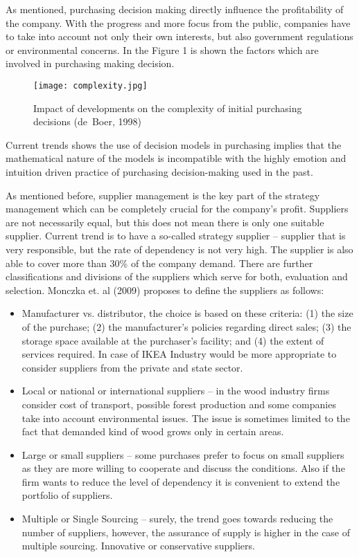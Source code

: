 \documentclass[oneside,12pt]{article}%
\begin{document}
As mentioned, purchasing decision making directly influence the profitability of the company. With the progress and more focus from the public, companies have to take into account not only their own interests, but also government regulations or environmental concerns. In the Figure 1 is shown the factors which are involved in purchasing making decision.

\begin{figure}[ht!]
  \texttt{[image: complexity.jpg]}
  \caption{Impact of developments on the complexity of initial purchasing decisions (de~Boer, 1998)}
\end{figure}

Current trends shows the use of decision models in purchasing implies that the mathematical nature of the models is incompatible with the highly emotion and intuition driven practice of purchasing decision-making used in the past.

As mentioned before, supplier management is the key part of the strategy management which can be completely crucial for the company’s profit. Suppliers are not necessarily equal, but this does not mean there is only one suitable supplier. Current trend is to have a so-called strategy supplier – supplier that is very responsible, but the rate of dependency is not very high. The supplier is also able to cover more than 30\% of the company demand.
There are further classifications and divisions of the suppliers which serve for both, evaluation and selection. Monczka et. al (2009) proposes to define the suppliers as follows:

\begin{itemize}
  \item Manufacturer vs. distributor, the choice is based on these criteria: (1) the size of the purchase; (2) the manufacturer’s policies regarding direct sales; (3) the storage space available at the purchaser’s facility; and (4) the extent of services required. In case of IKEA Industry would be more appropriate to consider suppliers from the private and state sector.
  \item Local or national or international suppliers – in the wood industry firms consider cost of transport, possible forest production and some companies take into account environmental issues. The issue is sometimes limited to the fact that demanded kind of wood grows only in certain areas.
  \item Large or small suppliers – some purchases prefer to focus on small suppliers as they are more willing to cooperate and discuss the conditions. Also if the firm wants to reduce the level of dependency it is convenient to extend the portfolio of suppliers.
  \item Multiple or Single Sourcing – surely, the trend goes towards reducing the number of suppliers, however, the assurance of supply is higher in the case of multiple sourcing.
  Innovative or conservative suppliers.
\end{itemize}
\end{document}
